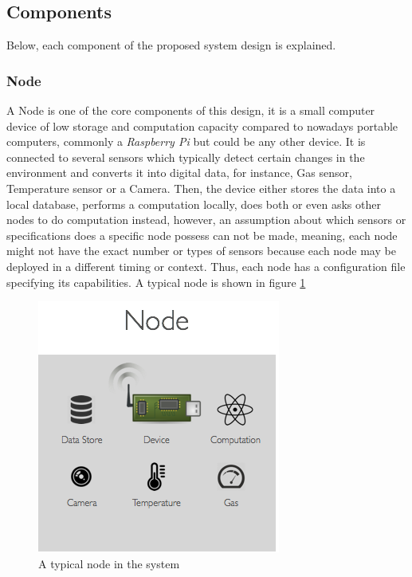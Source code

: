 \subsection{Components}
\label{sub:components}
Below, each component of the proposed system design is explained.

\subsubsection{Node}
\label{subsub:node}
A Node is one of the core components of this design, it is a small computer device of low storage and computation capacity compared to nowadays portable computers, commonly a \textit{Raspberry Pi} but could be any other device. It is connected to several sensors which typically detect certain changes in the environment and converts it into digital data, for instance, Gas sensor, Temperature sensor or a Camera. Then, the device either stores the data into a local database, performs a computation locally, does both or even asks other nodes to do computation instead, however, an assumption about which sensors or specifications does a specific node  possess can not be made, meaning, each node might not have the exact number or types of sensors because each node may be deployed in a different timing or context. Thus, each node has a configuration file specifying its capabilities. A typical node is shown in figure \ref{fig:node}

\begin{figure}[H]
\centering
 \includegraphics[scale=0.4]{images/node.png}
 \caption{A typical node in the system}
 \label{fig:node}
\end{figure}

